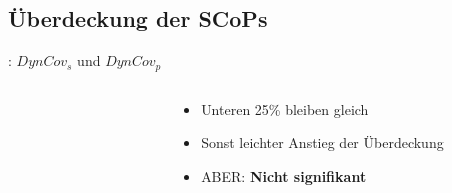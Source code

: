 \documentclass[aspectratio=169, xcolor=dvipsnames]{beamer}
\begin{document}
\subsection{Überdeckung der SCoPs}
\begin{frame}{\subsecname: \(DynCov_s\) und \(DynCov_p\)}
    \vspace{-1cm}
    \begin{columns}
        \begin{column}{5cm}
            \begin{figure}[!h]
                
            \end{figure}
        \end{column}
        \begin{column}{5cm}
            \begin{itemize}[<+(1)->]
                \item Unteren 25\% bleiben gleich
                \item Sonst leichter Anstieg der Überdeckung
                \item ABER: \textbf{Nicht signifikant}
            \end{itemize}
        \end{column}
    \end{columns}
\end{frame}
\end{document}
